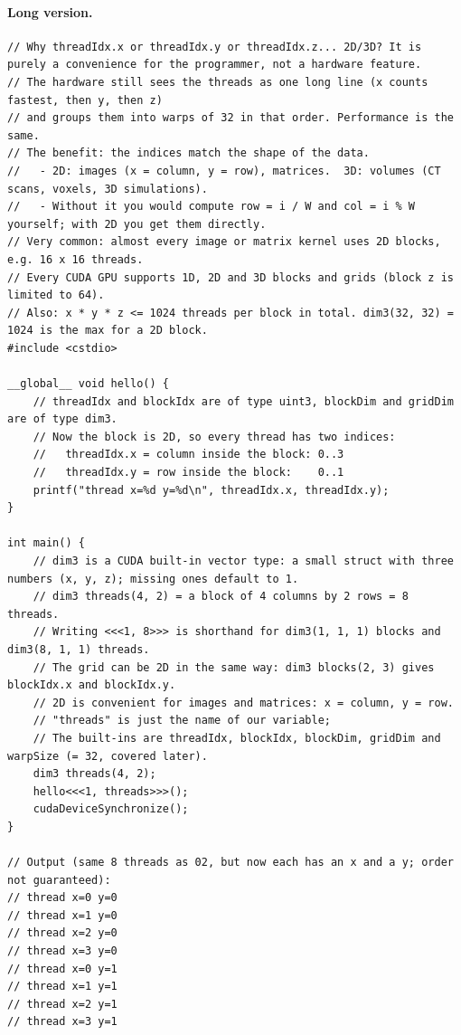 \documentclass[main.tex]{subfiles}
\begin{document}
\paragraph{Long version.}
\begin{lstlisting}[language=CUDA]
// Why threadIdx.x or threadIdx.y or threadIdx.z... 2D/3D? It is purely a convenience for the programmer, not a hardware feature.
// The hardware still sees the threads as one long line (x counts fastest, then y, then z)
// and groups them into warps of 32 in that order. Performance is the same.
// The benefit: the indices match the shape of the data.
//   - 2D: images (x = column, y = row), matrices.  3D: volumes (CT scans, voxels, 3D simulations).
//   - Without it you would compute row = i / W and col = i % W yourself; with 2D you get them directly.
// Very common: almost every image or matrix kernel uses 2D blocks, e.g. 16 x 16 threads.
// Every CUDA GPU supports 1D, 2D and 3D blocks and grids (block z is limited to 64).
// Also: x * y * z <= 1024 threads per block in total. dim3(32, 32) = 1024 is the max for a 2D block.
#include <cstdio>

__global__ void hello() {
    // threadIdx and blockIdx are of type uint3, blockDim and gridDim are of type dim3.
    // Now the block is 2D, so every thread has two indices:
    //   threadIdx.x = column inside the block: 0..3
    //   threadIdx.y = row inside the block:    0..1
    printf("thread x=%d y=%d\n", threadIdx.x, threadIdx.y);
}

int main() {
    // dim3 is a CUDA built-in vector type: a small struct with three numbers (x, y, z); missing ones default to 1.
    // dim3 threads(4, 2) = a block of 4 columns by 2 rows = 8 threads.
    // Writing <<<1, 8>>> is shorthand for dim3(1, 1, 1) blocks and dim3(8, 1, 1) threads.
    // The grid can be 2D in the same way: dim3 blocks(2, 3) gives blockIdx.x and blockIdx.y.
    // 2D is convenient for images and matrices: x = column, y = row.
    // "threads" is just the name of our variable;
    // The built-ins are threadIdx, blockIdx, blockDim, gridDim and warpSize (= 32, covered later).
    dim3 threads(4, 2);
    hello<<<1, threads>>>();
    cudaDeviceSynchronize();
}

// Output (same 8 threads as 02, but now each has an x and a y; order not guaranteed):
// thread x=0 y=0
// thread x=1 y=0
// thread x=2 y=0
// thread x=3 y=0
// thread x=0 y=1
// thread x=1 y=1
// thread x=2 y=1
// thread x=3 y=1
\end{lstlisting}
\end{document}
